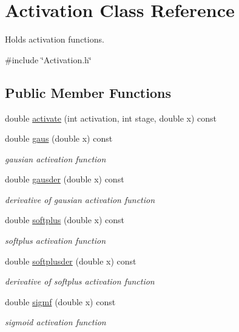 \hypertarget{classActivation}{}\section{Activation Class Reference}
\label{classActivation}


Holds activation functions.  




{\ttfamily \#include \char`\"{}Activation.\+h\char`\"{}}

\subsection*{Public Member Functions}
\begin{DoxyCompactItemize}
\item 
double \hyperlink{classActivation_a8318a7d7aa656862c929e8f8e68b07ba}{activate} (int activation, int stage, double x) const 
\item 
double \hyperlink{classActivation_a793912761e5ad16e5175b4fa5113133d}{gaus} (double x) const 
\begin{DoxyCompactList}\small\item\em gausian activation function \end{DoxyCompactList}\item 
double \hyperlink{classActivation_abc436fdeb1ff801223c7ebf67a748ebe}{gausder} (double x) const 
\begin{DoxyCompactList}\small\item\em derivative of gausian activation function \end{DoxyCompactList}\item 
double \hyperlink{classActivation_a5e9bf6975636c6d05b83d7d1acdf7df2}{softplus} (double x) const 
\begin{DoxyCompactList}\small\item\em softplus activation function \end{DoxyCompactList}\item 
double \hyperlink{classActivation_a2bac437e6009823d94b6be2d3c99971a}{softplusder} (double x) const 
\begin{DoxyCompactList}\small\item\em derivative of softplus activation function \end{DoxyCompactList}\item 
double \hyperlink{classActivation_a3bdc501310dfd0cef7c95d69faa3bc00}{sigmf} (double x) const 
\begin{DoxyCompactList}\small\item\em sigmoid activation function \end{DoxyCompactList}\item 

\end{DoxyCompactItemize}

